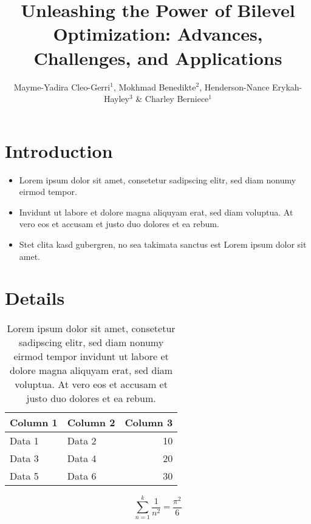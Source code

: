 \documentclass[letter]{bilevelorg}
\title{Unleashing the Power of Bilevel Optimization: Advances, Challenges, and Applications}
\author{Mayme-Yadira Cleo-Gerri$^1$,  Mokhmad Benedikte$^2$,   Henderson-Nance Erykah-Hayley$^3$  \&  Charley Berniece$^1$}
\begin{document}
\maketitle

\begin{abstract}
	\lipsum[1]
\end{abstract}

\section{Introduction}

\lipsum[1-3]

\begin{itemize}
  \item Lorem ipsum dolor sit amet, consetetur sadipscing elitr, sed diam nonumy eirmod tempor.
  \item Invidunt ut labore et dolore magna aliquyam erat, sed diam voluptua. At vero eos et accusam et justo duo dolores et ea rebum.
  \item Stet clita kasd gubergren, no sea takimata sanctus est Lorem ipsum dolor sit amet.

\end{itemize}

\lipsum[1-3]

\section{Details}



\begin{table}[!t]
  \centering
  \caption{
Lorem ipsum dolor sit amet, consetetur sadipscing elitr, sed diam nonumy eirmod tempor invidunt ut labore et dolore magna aliquyam erat, sed diam voluptua. At vero eos et accusam et justo duo dolores et ea rebum. 
}
  \label{tab:random}
  \begin{tabular}{llr}
    \toprule
    \textbf{Column 1} & \textbf{Column 2} & \textbf{Column 3} \\
    \midrule
    Data 1 & Data 2 & 10 \\
    Data 3 & Data 4 & 20 \\
    Data 5 & Data 6 & 30 \\
    \bottomrule
  \end{tabular}
\end{table}

\lipsum[1-3]

\[
\sum_{n=1}^{k} \frac{1}{n^2} = \frac{\pi^2}{6}
\]
\end{document}
